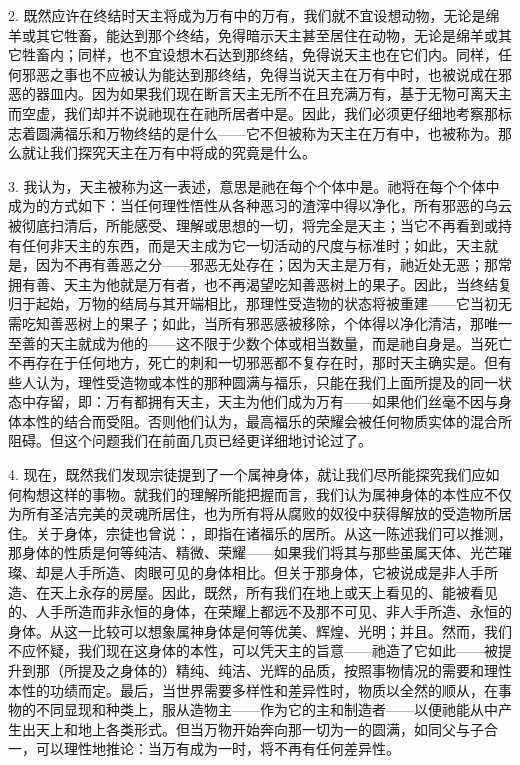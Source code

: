 2. 既然应许在终结时天主将成为万有中的万有，我们就不宜设想动物，无论是绵羊或其它牲畜，能达到那个终结，免得暗示天主甚至居住在动物，无论是绵羊或其它牲畜内；同样，也不宜设想木石达到那终结，免得说天主也在它们内。同样，任何邪恶之事也不应被认为能达到那终结，免得当说天主在万有中时，也被说成在邪恶的器皿内。因为如果我们现在断言天主无所不在且充满万有，基于无物可离天主而空虚，我们却并不说祂现在在祂所居者中是。因此，我们必须更仔细地考察那标志着圆满福乐和万物终结的是什么——它不但被称为天主在万有中，也被称为。那么就让我们探究天主在万有中将成的究竟是什么。\par

3. 我认为，天主被称为这一表述，意思是祂在每个个体中是。祂将在每个个体中成为的方式如下：当任何理性悟性从各种恶习的渣滓中得以净化，所有邪恶的乌云被彻底扫清后，所能感受、理解或思想的一切，将完全是天主；当它不再看到或持有任何非天主的东西，而是天主成为它一切活动的尺度与标准时；如此，天主就是，因为不再有善恶之分——邪恶无处存在；因为天主是万有，祂近处无恶；那常拥有善、天主为他就是万有者，也不再渴望吃知善恶树上的果子。因此，当终结复归于起始，万物的结局与其开端相比，那理性受造物的状态将被重建——它当初无需吃知善恶树上的果子；如此，当所有邪恶感被移除，个体得以净化清洁，那唯一至善的天主就成为他的——这不限于少数个体或相当数量，而是祂自身是。当死亡不再存在于任何地方，死亡的刺和一切邪恶都不复存在时，那时天主确实是。但有些人认为，理性受造物或本性的那种圆满与福乐，只能在我们上面所提及的同一状态中存留，即：万有都拥有天主，天主为他们成为万有——如果他们丝毫不因与身体本性的结合而受阻。否则他们认为，最高福乐的荣耀会被任何物质实体的混合所阻碍。但这个问题我们在前面几页已经更详细地讨论过了。\par

4. 现在，既然我们发现宗徒提到了一个属神身体，就让我们尽所能探究我们应如何构想这样的事物。就我们的理解所能把握而言，我们认为属神身体的本性应不仅为所有圣洁完美的灵魂所居住，也为所有将从腐败的奴役中获得解放的受造物所居住。关于身体，宗徒也曾说：，即指在诸福乐的居所。从这一陈述我们可以推测，那身体的性质是何等纯洁、精微、荣耀——如果我们将其与那些虽属天体、光芒璀璨、却是人手所造、肉眼可见的身体相比。但关于那身体，它被说成是非人手所造、在天上永存的房屋。因此，既然，所有我们在地上或天上看见的、能被看见的、人手所造而非永恒的身体，在荣耀上都远不及那不可见、非人手所造、永恒的身体。从这一比较可以想象属神身体是何等优美、辉煌、光明；并且。然而，我们不应怀疑，我们现在这身体的本性，可以凭天主的旨意——祂造了它如此——被提升到那（所提及之身体的）精纯、纯洁、光辉的品质，按照事物情况的需要和理性本性的功绩而定。最后，当世界需要多样性和差异性时，物质以全然的顺从，在事物的不同显现和种类上，服从造物主——作为它的主和制造者——以便祂能从中产生出天上和地上各类形式。但当万物开始奔向那一切为一的圆满，如同父与子合一，可以理性地推论：当万有成为一时，将不再有任何差异性。\par

